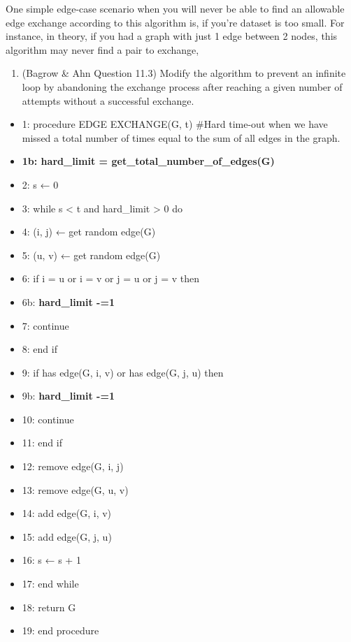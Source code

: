 \documentclass[11pt]{article}
\providecommand{\tightlist}{%
      \setlength{\itemsep}{0pt}\setlength{\parskip}{0pt}}
\begin{document}
    One simple edge-case scenario when you will never be able to find an
allowable edge exchange according to this algorithm is, if you're
dataset is too small. For instance, in theory, if you had a graph with
just 1 edge between 2 nodes, this algorithm may never find a pair to
exchange,

    \begin{enumerate}
\def\labelenumi{(\alph{enumi})}
\setcounter{enumi}{1}
\tightlist
\item
  (Bagrow \& Ahn Question 11.3) Modify the algorithm to prevent an
  infinite loop by abandoning the exchange process after reaching a
  given number of attempts without a successful exchange.
\end{enumerate}

    \begin{itemize}
\tightlist
\item
  1: procedure EDGE EXCHANGE(G, t) \#Hard time-out when we have missed a
  total number of times equal to the sum of all edges in the graph.
\item
  \textbf{1b: hard\_limit = get\_total\_number\_of\_edges(G)}
\item
  2: s ← 0
\item
  3: while s \textless{} t and hard\_limit \textgreater{} 0 do
\item
  4: (i, j) ← get random edge(G)
\item
  5: (u, v) ← get random edge(G)
\item
  6: if i = u or i = v or j = u or j = v then
\item
  6b: \textbf{hard\_limit -=1}
\item
  7: continue
\item
  8: end if
\item
  9: if has edge(G, i, v) or has edge(G, j, u) then
\item
  9b: \textbf{hard\_limit -=1}
\item
  10: continue
\item
  11: end if
\item
  12: remove edge(G, i, j)
\item
  13: remove edge(G, u, v)
\item
  14: add edge(G, i, v)
\item
  15: add edge(G, j, u)
\item
  16: s ← s + 1
\item
  17: end while
\item
  18: return G
\item
  19: end procedure
\end{itemize}
\end{document}

